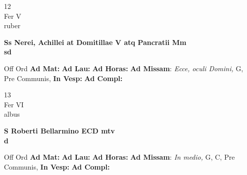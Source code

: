 \documentclass[10pt, openany]{book}
\begin{document}
        \begin{center}
            \begin{minipage}{3.5in}
                \vspace{2em}
                \begin{minipage}{0.5in}
                    {\Huge 12} \\
                    {\normalsize Fer V} \\
                    {\normalsize ruber}
                \end{minipage}
                \begin{minipage}{3.0in}
                    \textbf{ \large Ss Nerei, Achillei at Domitillae V atq Pancratii Mm \\
                    \textnormal{\normalsize sd}} \\ 
                \end{minipage}
                \begin{justify}Off Ord
                    \textbf{Ad Mat: }
                    \textbf{Ad Lau: }
                    \textbf{Ad Horas: }\textbf{Ad Missam}: \textit{Ecce, oculi Domini,} G, Pre Communis,  
                    \textbf{In Vesp: }
                    \textbf{Ad Compl: }
                \end{justify}
            \end{minipage}
        \end{center}
    
        \begin{center}
            \begin{minipage}{3.5in}
                \vspace{2em}
                \begin{minipage}{0.5in}
                    {\Huge 13} \\
                    {\normalsize Fer VI} \\
                    {\normalsize albus}
                \end{minipage}
                \begin{minipage}{3.0in}
                    \textbf{ \large S Roberti Bellarmino ECD mtv \\
                    \textnormal{\normalsize d}} \\ 
                \end{minipage}
                \begin{justify}Off Ord
                    \textbf{Ad Mat: }
                    \textbf{Ad Lau: }
                    \textbf{Ad Horas: }\textbf{Ad Missam}: \textit{In medio,} G, C, Pre Communis,  
                    \textbf{In Vesp: }
                    \textbf{Ad Compl: }
                \end{justify}
            \end{minipage}
        \end{center}
    
\end{document}
